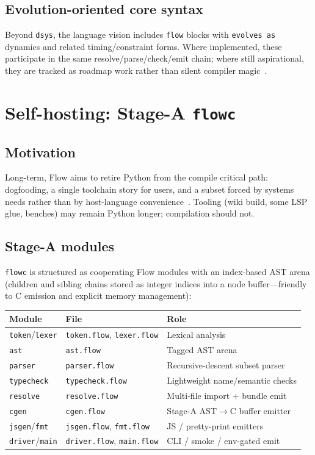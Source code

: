 \documentclass[11pt,a4paper]{article}
\theoremstyle{remark}
\begin{document}
\subsection{Evolution-oriented core syntax}

Beyond \texttt{dsys}, the language vision includes \texttt{flow} blocks with
\texttt{evolves as} dynamics and related timing/constraint forms. Where
implemented, these participate in the same resolve/parse/check/emit chain; where
still aspirational, they are tracked as roadmap work rather than silent
compiler magic~\cite{flow-vision}.

\section{Self-hosting: Stage-A \texttt{flowc}}
\label{sec:selfhost}

\subsection{Motivation}

Long-term, Flow aims to retire Python from the compile critical path: dogfooding,
a single toolchain story for users, and a subset forced by systems needs rather
than by host-language convenience~\cite{flow-selfhost}. Tooling (wiki build, some
LSP glue, benches) may remain Python longer; compilation should not.

\subsection{Stage-A modules}

\texttt{flowc} is structured as cooperating Flow modules with an index-based
AST arena (children and sibling chains stored as integer indices into a node
buffer---friendly to C emission and explicit memory management):

\begin{center}
\begin{tabular}{@{}llp{7.2cm}@{}}
\toprule
Module & File & Role \\
\midrule
\texttt{token}/\texttt{lexer} & \texttt{token.flow}, \texttt{lexer.flow} & Lexical analysis \\
\texttt{ast} & \texttt{ast.flow} & Tagged AST arena \\
\texttt{parser} & \texttt{parser.flow} & Recursive-descent subset parser \\
\texttt{typecheck} & \texttt{typecheck.flow} & Lightweight name/semantic checks \\
\texttt{resolve} & \texttt{resolve.flow} & Multi-file import + bundle emit \\
\texttt{cgen} & \texttt{cgen.flow} & Stage-A AST$\to$C buffer emitter \\
\texttt{jsgen}/\texttt{fmt} & \texttt{jsgen.flow}, \texttt{fmt.flow} & JS / pretty-print emitters \\
\texttt{driver}/\texttt{main} & \texttt{driver.flow}, \texttt{main.flow} & CLI / smoke / env-gated emit \\
\bottomrule
\end{tabular}
\end{center}
\end{document}
